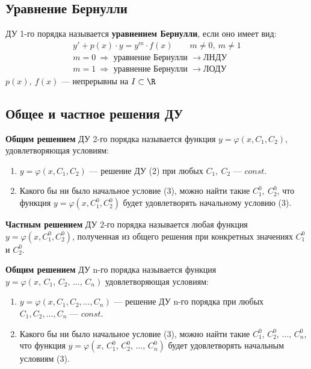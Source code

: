 \subsection{Уравнение Бернулли}
\begin{definition}
    ДУ 1-го порядка называется \textbf{уравнением Бернулли}, если оно имеет вид:
    \begin{gather*}
        \boxed{y' + p(x) \cdot y = y^{m} \cdot f(x)}\qquad m \ne 0,\ m \ne 1 \\[1ex]
        m = 0\ \Rightarrow \text{ уравнение Бернулли } \longrightarrow \text{ЛНДУ} \\
        m = 1\ \Rightarrow \text{ уравнение Бернулли } \longrightarrow \text{ЛОДУ} 
    \end{gather*}
    $p(x),\ f(x)$ --- непрерывны на $I \subset \R$
\end{definition}

\subsection{Общее и частное решения ДУ}

\begin{definition}
    \textbf{Общим решением} ДУ 2-го порядка называется функция \break$y = \varphi(x, C_1, C_2)$, удовлетворяющая условиям:
    \begin{enumerate}
        \item $y = \varphi(x, C_1, C_2)$ --- решение ДУ (2) при любых $C_1,\ C_2$ --- $const$.
        \item Какого бы ни было начальное условие (3), можно найти такие $C_1^0,\ C_2^0$, что функция $y = \varphi(x, C_1^0, C_2^0)$ будет удовлетворять начальному условию (3).
    \end{enumerate}
\end{definition}

\begin{definition}
    \textbf{Частным решением} ДУ 2-го порядка называется любая функция $y = \varphi(x, C_1^0, C_2^0)$, полученная из общего решения при конкретных значениях $C_1^0$ и $C_2^0$.
\end{definition}
\newpage
\begin{definition}
    \textbf{Общим решением} ДУ n-го порядка называется функция\break$y = \varphi(x,\, C_1,\, C_2,\, \ldots,\, C_n)$ удовлетворяющая условиям:
    \begin{enumerate}
        \item $y = \varphi(x, C_1, C_2, \ldots, C_n)$ --- решение ДУ n-го порядка при любых $C_1, C_2, \ldots, C_n$ --- $const$.
        \item Какого бы ни было начальное условие (3), можно найти такие $C_1^0,\, C_2^0,\, \ldots,\, C_n^0$, что функция $y = \varphi(x,\, C_1^0,\, C_2^0,\, \ldots,\, C_n^0)$ будет удовлетворять начальным условиям (3).
    \end{enumerate}
\end{definition}

